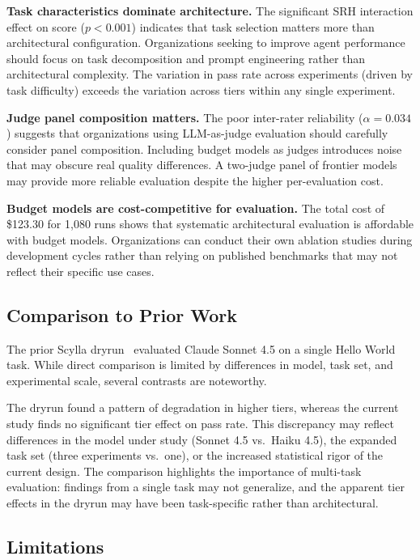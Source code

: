 \documentclass[11pt]{article}
\begin{document}
\textbf{Task characteristics dominate architecture.} The significant SRH
interaction effect on score ($p < 0.001$) indicates that task selection
matters more than architectural configuration. Organizations seeking to
improve agent performance should focus on task decomposition and prompt
engineering rather than architectural complexity. The variation in pass rate
across experiments (driven by task difficulty) exceeds the variation across
tiers within any single experiment.

\textbf{Judge panel composition matters.} The poor inter-rater
reliability ($\alpha = 0.034$) suggests that organizations using
LLM-as-judge evaluation should carefully consider panel composition.
Including budget models as judges introduces noise that may obscure real
quality differences. A two-judge panel of frontier models may provide more
reliable evaluation despite the higher per-evaluation cost.

\textbf{Budget models are cost-competitive for evaluation.} The total cost
of \$123.30 for 1,080 runs shows that systematic architectural
evaluation is affordable with budget models. Organizations can conduct their
own ablation studies during development cycles rather than relying on
published benchmarks that may not reflect their specific use cases.

\subsection{Comparison to Prior Work}
\label{sec:comparison_prior}

The prior Scylla dryrun~\cite{scylla2026dryrun} evaluated Claude Sonnet 4.5
on a single Hello World task. While direct comparison is limited by
differences in model, task set, and experimental scale, several contrasts
are noteworthy.

The dryrun found a pattern of degradation in higher tiers, whereas the
current study finds no significant tier effect on pass rate. This discrepancy
may reflect differences in the model under study (Sonnet 4.5 vs.\ Haiku 4.5),
the expanded task set (three experiments vs.\ one), or the increased
statistical rigor of the current design. The comparison highlights the
importance of multi-task evaluation: findings from a single task may not
generalize, and the apparent tier effects in the dryrun may have been
task-specific rather than architectural.

\subsection{Limitations}
\label{sec:limitations}
\end{document}
